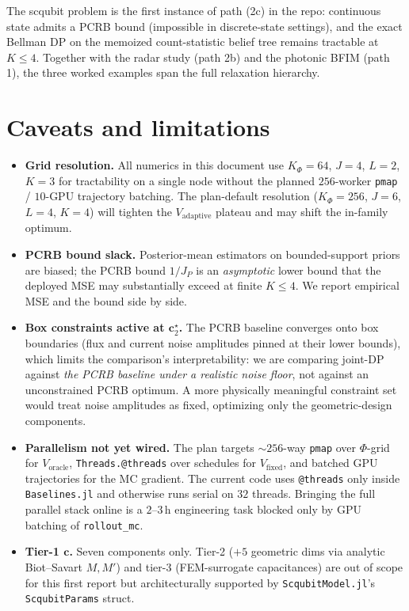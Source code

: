 \documentclass[11pt,a4paper]{article}
\begin{document}
The scqubit problem is the first instance of path (2c) in the repo: continuous state admits a PCRB bound (impossible in discrete-state settings), and the exact Bellman DP on the memoized count-statistic belief tree remains tractable at $K \le 4$.  Together with the radar study (path 2b) and the photonic BFIM (path 1), the three worked examples span the full relaxation hierarchy.

\section{Caveats and limitations}
\label{sec:caveats}

\begin{itemize}[leftmargin=2em]
  \item \textbf{Grid resolution.}  All numerics in this document use $K_\Phi = 64$, $J = 4$, $L = 2$, $K = 3$ for tractability on a single node without the planned $256$-worker \texttt{pmap} / $10$-GPU trajectory batching.  The plan-default resolution ($K_\Phi = 256$, $J = 6$, $L = 4$, $K = 4$) will tighten the $V_{\text{adaptive}}$ plateau and may shift the in-family optimum.
  \item \textbf{PCRB bound slack.}  Posterior-mean estimators on bounded-support priors are biased; the PCRB bound $1/J_P$ is an \emph{asymptotic} lower bound that the deployed MSE may substantially exceed at finite $K \le 4$.  We report empirical MSE and the bound side by side.
  \item \textbf{Box constraints active at $\bm c^\star_2$.}  The PCRB baseline converges onto box boundaries (flux and current noise amplitudes pinned at their lower bounds), which limits the comparison's interpretability: we are comparing joint-DP against \emph{the PCRB baseline under a realistic noise floor}, not against an unconstrained PCRB optimum.  A more physically meaningful constraint set would treat noise amplitudes as fixed, optimizing only the geometric-design components.
  \item \textbf{Parallelism not yet wired.}  The plan targets $\sim 256$-way \texttt{pmap} over $\Phi$-grid for $V_{\text{oracle}}$, \texttt{Threads.@threads} over schedules for $V_{\text{fixed}}$, and batched GPU trajectories for the MC gradient.  The current code uses \texttt{@threads} only inside \texttt{Baselines.jl} and otherwise runs serial on $32$ threads.  Bringing the full parallel stack online is a $2$--$3$\,h engineering task blocked only by GPU batching of \texttt{rollout\_mc}.
  \item \textbf{Tier-1 $\bm c$.}  Seven components only.  Tier-2 ($+5$ geometric dims via analytic Biot--Savart $M, M'$) and tier-3 (FEM-surrogate capacitances) are out of scope for this first report but architecturally supported by \texttt{ScqubitModel.jl}'s \texttt{ScqubitParams} struct.
\end{itemize}
\end{document}
